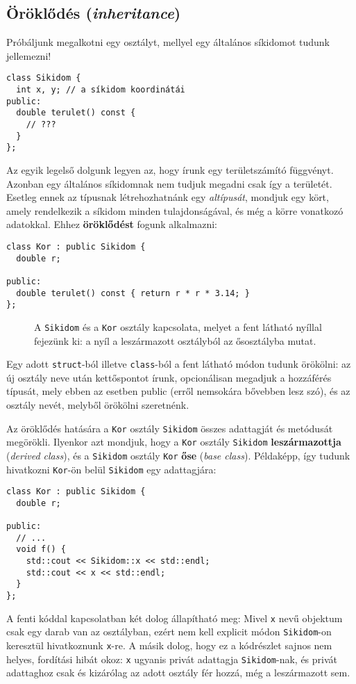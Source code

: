 \documentclass[../cpp_book/cpp_book.tex]{subfiles}
\begin{document}
	\subsection{Öröklődés (\textit{inheritance})}
	Próbáljunk megalkotni egy osztályt, mellyel egy általános síkidomot tudunk jellemezni!
	\begin{lstlisting}
class Sikidom {
  int x, y; // a síkidom koordinátái
public:
  double terulet() const {
    // ???
  }
};
	\end{lstlisting}
	Az egyik legelső dolgunk legyen az, hogy írunk egy területszámító függvényt. Azonban egy általános síkidomnak nem tudjuk megadni csak így a területét. Esetleg ennek az típusnak létrehozhatnánk egy \textit{altípusát}, mondjuk egy kört, amely rendelkezik a síkidom minden tulajdonságával, és még a körre vonatkozó adatokkal. Ehhez \textbf{öröklődést} fogunk alkalmazni:
	\begin{lstlisting}
class Kor : public Sikidom {
  double r;

public:
  double terulet() const { return r * r * 3.14; }
};
	\end{lstlisting}
	\begin{figure}[!h]
		\centering
		
		
		\caption{A \texttt{Sikidom} és a \texttt{Kor} osztály kapcsolata, melyet a fent látható nyíllal fejezünk ki: a nyíl a leszármazott osztályból az ősosztályba mutat.}\label{fig_uml_inheritance_example}
	\end{figure}
	Egy adott \texttt{struct}-ból illetve \texttt{class}-ból a fent látható módon tudunk örökölni: az új osztály neve után kettőspontot írunk, opcionálisan megadjuk a hozzáférés típusát, mely ebben az esetben public (erről nemsokára bővebben lesz szó), és az osztály nevét, melyből örökölni szeretnénk.

	Az öröklődés hatására a \texttt{Kor} osztály \texttt{Sikidom} összes adattagját és metódusát megörökli. Ilyenkor azt mondjuk, hogy a \texttt{Kor} osztály \texttt{Sikidom} \textbf{leszármazottja} (\textit{derived class}), és a \texttt{Sikidom} osztály \texttt{Kor} \textbf{őse} (\textit{base class}). Példaképp, így tudunk hivatkozni \texttt{Kor}-ön belül \texttt{Sikidom} egy adattagjára:
	\begin{lstlisting}
class Kor : public Sikidom {
  double r;

public:
  // ...
  void f() {
    std::cout << Sikidom::x << std::endl;
    std::cout << x << std::endl;
  }
};
	\end{lstlisting}
	A fenti kóddal kapcsolatban két dolog állapítható meg: Mivel \texttt{x} nevű objektum csak egy darab van az osztályban, ezért nem kell explicit módon \texttt{Sikidom}-on keresztül hivatkoznunk \texttt{x}-re. A másik dolog, hogy ez a kódrészlet sajnos nem helyes, fordítási hibát okoz: \texttt{x} ugyanis privát adattagja \texttt{Sikidom}-nak, és privát adattaghoz csak és kizárólag az adott osztály fér hozzá, még a leszármazott sem.
\end{document}
